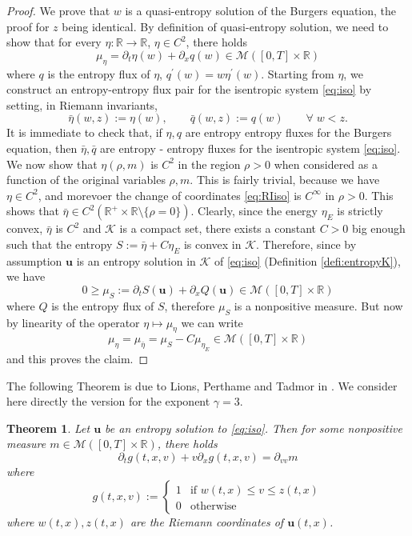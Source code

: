 \documentclass[11pt, twoside, reqno]{amsart}
\newtheorem{thm}{Theorem}[section]
\theoremstyle{definition}
\theoremstyle{remark}
\numberwithin{equation}{section}
\newcommand{\mc}[1]{\mathcal{#1}}
\newcommand{\bs}[1]{\boldsymbol{#1}}
\newcommand{\msc}[1]{\mathscr{#1}}
\begin{document}
\begin{proof}
    We prove that $w$ is a quasi-entropy solution of the Burgers equation, the proof for $z$ being identical. By definition of quasi-entropy solution, we need to show that for every $\eta : \mathbb R\to \mathbb R$, $\eta \in C^2$, there holds
    $$
    \mu_\eta = \partial_t \eta(w) + \partial_x q(w) \in \mathscr M([0,T] \times \mathbb R)
    $$
    where $q$ is the entropy flux of $\eta$, $q^\prime(w) = w \eta^\prime(w)$. Starting from $\eta$, we construct an entropy-entropy flux pair for the isentropic system \eqref{eq:iso} by setting, in Riemann invariants,
    $$
    \bar \eta(w,z) := \eta(w), \qquad \bar q(w, z) := q(w) \qquad \forall \; w < z.
    $$
It is immediate to check that, if $\eta, q$ are entropy entropy fluxes for the Burgers equation, then $\bar \eta, \bar q$ are entropy - entropy fluxes for the isentropic system \eqref{eq:iso}. We now show that $\eta(\rho, m)$ is $C^2$ in the region $\rho >0$ when considered as a function of the original variables $\rho, m$. This is fairly trivial, because we have $\eta \in C^2$, and morevoer the change of coordinates \eqref{eq:RIiso} is $C^\infty$ in $\rho > 0$. This shows that $\bar \eta \in C^2(\mathbb R^+\times \mathbb R \setminus \{\rho = 0\})$.
Clearly, since the energy $\eta_E$ is strictly convex, $\bar \eta$ is $C^2$ and $\mc K$ is a compact set, there exists a constant $C > 0$ big enough such that the entropy $S := \bar \eta + C \eta_E$ is convex in $\mc K$. Therefore, since by assumption $\bs u$ is an entropy solution in $\mc K$ of \eqref{eq:iso} (Definition \ref{defi:entropyK}), we have
\begin{equation}
    0 \geq \mu_S := \partial_t S(\bs u) + \partial_x Q(\bs u) \in \msc M([0,T] \times \mathbb R)
\end{equation}
where $Q$ is the entropy flux of $S$, therefore $\mu_S$ is a nonpositive measure. But now by linearity of the operator $\eta \mapsto \mu_{\eta}$ we can write 
$$
\mu_\eta = \mu_{\bar \eta} = \mu_S - C \mu_{\eta_E} \in \msc M([0,T] \times \mathbb R)
$$
and this proves the claim.
\end{proof}

The following Theorem is due to Lions, Perthame and Tadmor in \cite{LPT_kineticise}. We consider here directly the version for the exponent $\gamma = 3$.
\begin{thm}\label{thm:lptkin}
    Let $\bs u$ be an entropy solution to \eqref{eq:iso}. Then for some nonpositive measure $m \in \msc M([0,T] \times \mathbb R)$, there holds
    \begin{equation}
        \partial_t g(t,x,v)  + v \partial_x g(t,x,v) = \partial_{vv} m
    \end{equation}
    where 
    $$
    g(t,x,v) := \begin{cases}
        1 & \text{if $w(t,x) \leq v \leq z(t,x)$}\\
        0 & \text{otherwise}
    \end{cases}
    $$
    where $w(t,x), z(t,x)$ are the Riemann coordinates of $\bs u(t,x)$.
\end{thm}
\end{document}
